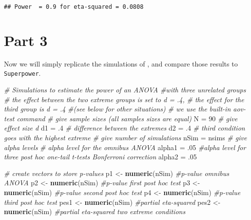\documentclass[]{book}
\newenvironment{Shaded}{\begin{snugshade}}{\end{snugshade}}
\newcommand{\CommentTok}[1]{\textcolor[rgb]{0.56,0.35,0.01}{\textit{#1}}}
\newcommand{\DecValTok}[1]{\textcolor[rgb]{0.00,0.00,0.81}{#1}}
\newcommand{\FloatTok}[1]{\textcolor[rgb]{0.00,0.00,0.81}{#1}}
\newcommand{\KeywordTok}[1]{\textcolor[rgb]{0.13,0.29,0.53}{\textbf{#1}}}
\newcommand{\NormalTok}[1]{#1}
\newcommand{\StringTok}[1]{\textcolor[rgb]{0.31,0.60,0.02}{#1}}
\begin{document}
\begin{verbatim}
## Power  = 0.9 for eta-squared = 0.0808
\end{verbatim}

\begin{Shaded}
\end{Shaded}

\hypertarget{part-3}{%
\section{Part 3}\label{part-3}}

Now we will simply replicate the simulations of \citet{brysbaert2019many}, and compare those results to \texttt{Superpower}.

\begin{Shaded}
\begin{Highlighting}[]
\CommentTok{# Simulations to estimate the power of an ANOVA }
\CommentTok{#with three unrelated groups}
\CommentTok{# the effect between the two extreme groups is set to d = .4, }
\CommentTok{# the effect for the third group is d = .4 }
\CommentTok{#(see below for other situations)}
\CommentTok{# we use the built-in aov-test command}
\CommentTok{# give sample sizes (all samples sizes are equal)}
\NormalTok{N =}\StringTok{ }\DecValTok{90}
\CommentTok{# give effect size d}
\NormalTok{d1 =}\StringTok{ }\FloatTok{.4} \CommentTok{# difference between the extremes}
\NormalTok{d2 =}\StringTok{ }\FloatTok{.4} \CommentTok{# third condition goes with the highest extreme}
\CommentTok{# give number of simulations}
\NormalTok{nSim =}\StringTok{ }\NormalTok{nsims}
\CommentTok{# give alpha levels}
\CommentTok{# alpha level for the omnibus ANOVA}
\NormalTok{alpha1 =}\StringTok{ }\FloatTok{.05} 
\CommentTok{#alpha level for three post hoc one-tail t-tests Bonferroni correction}
\NormalTok{alpha2 =}\StringTok{ }\FloatTok{.05} 
\end{Highlighting}
\end{Shaded}

\begin{Shaded}
\begin{Highlighting}[]
\CommentTok{# create vectors to store p-values}
\NormalTok{p1 <-}\StringTok{ }\KeywordTok{numeric}\NormalTok{(nSim) }\CommentTok{#p-value omnibus ANOVA}
\NormalTok{p2 <-}\StringTok{ }\KeywordTok{numeric}\NormalTok{(nSim) }\CommentTok{#p-value first post hoc test}
\NormalTok{p3 <-}\StringTok{ }\KeywordTok{numeric}\NormalTok{(nSim) }\CommentTok{#p-value second post hoc test}
\NormalTok{p4 <-}\StringTok{ }\KeywordTok{numeric}\NormalTok{(nSim) }\CommentTok{#p-value third post hoc test}
\NormalTok{pes1 <-}\StringTok{ }\KeywordTok{numeric}\NormalTok{(nSim) }\CommentTok{#partial eta-squared}
\NormalTok{pes2 <-}\StringTok{ }\KeywordTok{numeric}\NormalTok{(nSim) }\CommentTok{#partial eta-squared two extreme conditions}
\end{Highlighting}
\end{Shaded}
\end{document}

